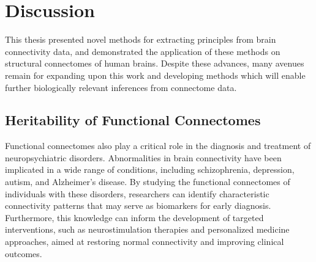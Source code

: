 \chapter{Discussion}\label{chap:discussion}

This thesis presented novel methods for extracting principles from brain connectivity data, and demonstrated the application of these methods on structural connectomes of human brains. Despite these advances, many avenues remain for expanding upon this work and developing methods which will enable further biologically relevant inferences from connectome data.

\section{Heritability of Functional Connectomes}
Functional connectomes also play a critical role in the diagnosis and treatment of neuropsychiatric disorders. Abnormalities in brain connectivity have been implicated in a wide range of conditions, including schizophrenia, depression, autism, and Alzheimer’s disease. By studying the functional connectomes of individuals with these disorders, researchers can identify characteristic connectivity patterns that may serve as biomarkers for early diagnosis. Furthermore, this knowledge can inform the development of targeted interventions, such as neurostimulation therapies and personalized medicine approaches, aimed at restoring normal connectivity and improving clinical outcomes.
